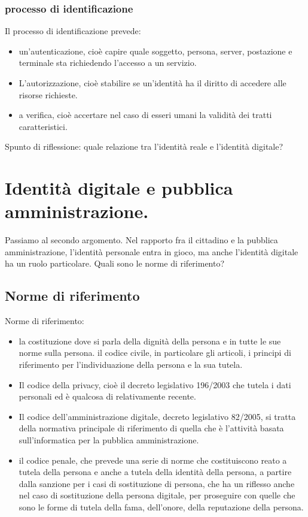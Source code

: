 \subsubsection{processo di identificazione }
 
 Il processo di identificazione prevede:
 \begin{itemize}
     \item un'autenticazione, cioè capire quale soggetto, persona, server, postazione e terminale sta richiedendo l'accesso a un servizio.
     \item L'autorizzazione, cioè stabilire se un'identità ha il diritto di accedere alle risorse richieste.
     \item a verifica, cioè accertare nel caso di esseri umani la validità dei tratti caratteristici.
 \end{itemize}
 
 Spunto di riflessione: quale relazione tra l'identità reale e l'identità digitale?
 
 \section{Identità digitale e pubblica amministrazione.}
 Passiamo al secondo argomento.  Nel rapporto fra il cittadino e la pubblica amministrazione, l'identità personale  entra in gioco, ma anche l'identità digitale ha un ruolo particolare. Quali sono le norme di riferimento?\par
 \subsection{Norme di riferimento}
 Norme di riferimento:
\begin{itemize}
    \item la costituzione dove si parla della dignità della persona e in tutte le sue norme sulla persona. il codice civile, in particolare gli articoli, i principi di riferimento per l'individuazione della persona e la sua tutela. 
     \item Il codice della privacy, cioè il decreto legislativo 196/2003 che tutela i dati personali ed è qualcosa di relativamente recente. 
    \item Il codice dell'amministrazione digitale, decreto legislativo 82/2005, si tratta della normativa principale di riferimento di quella che è l'attività basata sull'informatica per la pubblica amministrazione. 
    \item il codice penale, che prevede una serie di norme che costituiscono reato a tutela della persona e anche a tutela della identità della persona, a partire dalla sanzione per i casi di sostituzione di persona, che ha un riflesso anche nel caso di sostituzione della persona digitale, per proseguire con quelle che sono le forme di tutela della fama, dell'onore, della reputazione della persona.  
\end{itemize}
 
